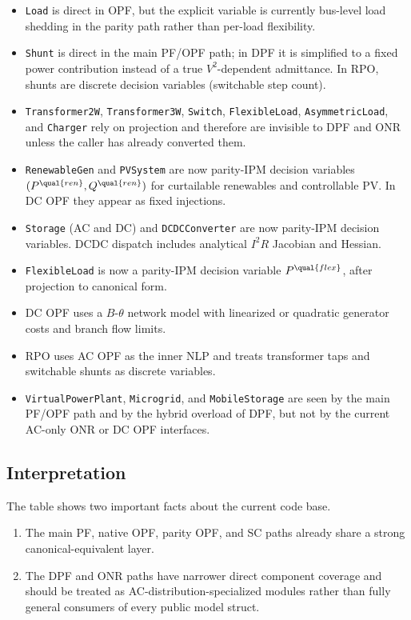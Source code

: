 \begin{itemize}
  \item \texttt{Load} is direct in OPF, but the explicit variable is currently bus-level load shedding in the parity path rather than per-load flexibility.
  \item \texttt{Shunt} is direct in the main PF/OPF path; in DPF it is simplified to a fixed power contribution instead of a true \(V^2\)-dependent admittance.  In RPO, shunts are discrete decision variables (switchable step count).
  \item \texttt{Transformer2W}, \texttt{Transformer3W}, \texttt{Switch}, \texttt{FlexibleLoad}, \texttt{AsymmetricLoad}, and \texttt{Charger} rely on projection and therefore are invisible to DPF and ONR unless the caller has already converted them.
  \item \texttt{RenewableGen} and \texttt{PVSystem} are now parity-IPM decision variables \((P^{\qual{ren}}, Q^{\qual{ren}})\) for curtailable renewables and controllable PV.  In DC OPF they appear as fixed injections.
  \item \texttt{Storage} (AC and DC) and \texttt{DCDCConverter} are now parity-IPM decision variables.  DCDC dispatch includes analytical \(I^2R\) Jacobian and Hessian.
  \item \texttt{FlexibleLoad} is now a parity-IPM decision variable \(P^{\qual{flex}}\),  after projection to canonical form.
  \item DC OPF uses a \(B\)-\(\theta\) network model with linearized or quadratic generator costs and branch flow limits.
  \item RPO uses AC OPF as the inner NLP and treats transformer taps and switchable shunts as discrete variables.
  \item \texttt{VirtualPowerPlant}, \texttt{Microgrid}, and \texttt{MobileStorage} are seen by the main PF/OPF path and by the hybrid overload of DPF, but not by the current AC-only ONR or DC OPF interfaces.
\end{itemize}

\subsection{Interpretation}

The table shows two important facts about the current code base.
\begin{enumerate}
  \item The main PF, native OPF, parity OPF, and SC paths already share a strong canonical-equivalent layer.
  \item The DPF and ONR paths have narrower direct component coverage and should be treated as AC-distribution-specialized modules rather than fully general consumers of every public model struct.
\end{enumerate}
